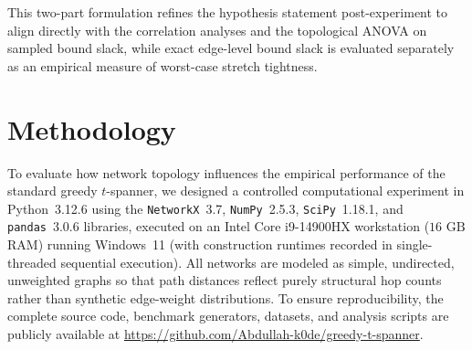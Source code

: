 \documentclass[conference]{IEEEtran}
\begin{document}
This two-part formulation refines the hypothesis statement post-experiment to align directly with the correlation analyses and the topological ANOVA on sampled bound slack, while exact edge-level bound slack is evaluated separately as an empirical measure of worst-case stretch tightness.


\section{Methodology}
To evaluate how network topology influences the empirical performance of the standard greedy $t$-spanner, we designed a controlled computational experiment in Python~3.12.6 using the \texttt{NetworkX}~3.7, \texttt{NumPy}~2.5.3, \texttt{SciPy}~1.18.1, and \texttt{pandas}~3.0.6 libraries, executed on an Intel Core i9-14900HX workstation ($16\text{ GB}$ RAM) running Windows~11 (with construction runtimes recorded in single-threaded sequential execution). All networks are modeled as simple, undirected, unweighted graphs so that path distances reflect purely structural hop counts rather than synthetic edge-weight distributions. To ensure reproducibility, the complete source code, benchmark generators, datasets, and analysis scripts are publicly available at \url{https://github.com/Abdullah-k0de/greedy-t-spanner}.
\end{document}
